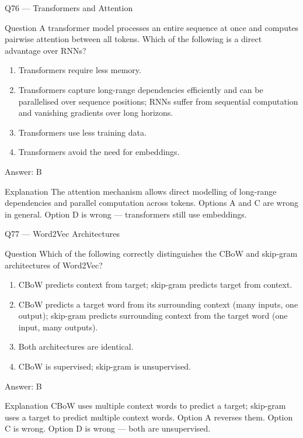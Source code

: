 \documentclass[aspectratio=169,8pt]{beamer}
\begin{document}
	\begin{frame}{Q76 --- Transformers and Attention}
		\begin{block}{Question}
			A transformer model processes an entire sequence at once and computes pairwise attention between all tokens. Which of the following is a direct advantage over RNNs?
		\end{block}
		\begin{enumerate}
			\item Transformers require less memory.
			\item Transformers capture long-range dependencies efficiently and can be parallelised over sequence positions; RNNs suffer from sequential computation and vanishing gradients over long horizons.
			\item Transformers use less training data.
			\item Transformers avoid the need for embeddings.
		\end{enumerate}
		\begin{exampleblock}{Answer: B}\end{exampleblock}
		\begin{block}{Explanation}
			The attention mechanism allows direct modelling of long-range dependencies and parallel computation across tokens. Options A and C are wrong in general. Option D is wrong --- transformers still use embeddings.
		\end{block}
	\end{frame}
	
	\begin{frame}{Q77 --- Word2Vec Architectures}
		\begin{block}{Question}
			Which of the following correctly distinguishes the CBoW and skip-gram architectures of Word2Vec?
		\end{block}
		\begin{enumerate}
			\item CBoW predicts context from target; skip-gram predicts target from context.
			\item CBoW predicts a target word from its surrounding context (many inputs, one output); skip-gram predicts surrounding context from the target word (one input, many outputs).
			\item Both architectures are identical.
			\item CBoW is supervised; skip-gram is unsupervised.
		\end{enumerate}
		\begin{exampleblock}{Answer: B}\end{exampleblock}
		\begin{block}{Explanation}
			CBoW uses multiple context words to predict a target; skip-gram uses a target to predict multiple context words. Option A reverses them. Option C is wrong. Option D is wrong --- both are unsupervised.
		\end{block}
	\end{frame}
	
\end{document}
